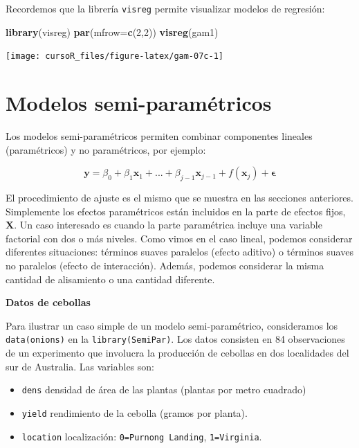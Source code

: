 \documentclass[]{book}
\newenvironment{Shaded}{\begin{snugshade}}{\end{snugshade}}
\newcommand{\KeywordTok}[1]{\textcolor[rgb]{0.13,0.29,0.53}{\textbf{#1}}}
\newcommand{\DataTypeTok}[1]{\textcolor[rgb]{0.13,0.29,0.53}{#1}}
\newcommand{\DecValTok}[1]{\textcolor[rgb]{0.00,0.00,0.81}{#1}}
\newcommand{\NormalTok}[1]{#1}
\begin{document}
Recordemos que la librería \texttt{visreg} permite visualizar modelos de
regresión:

\begin{Shaded}
\begin{Highlighting}[]
\KeywordTok{library}\NormalTok{(visreg)}
\KeywordTok{par}\NormalTok{(}\DataTypeTok{mfrow=}\KeywordTok{c}\NormalTok{(}\DecValTok{2}\NormalTok{,}\DecValTok{2}\NormalTok{))}
\KeywordTok{visreg}\NormalTok{(gam1)}
\end{Highlighting}
\end{Shaded}

\begin{center}\texttt{[image: cursoR\_files/figure-latex/gam-07c-1]} \end{center}

\section{Modelos semi-paramétricos}\label{modelos-semi-paramuxe9tricos}

Los modelos semi-paramétricos permiten combinar componentes lineales
(paramétricos) y no paramétricos, por ejemplo:

\[
\boldsymbol{y} = \beta_0 + \beta_1\boldsymbol{x}_1 + ... + \beta_{j-1}\boldsymbol{x}_{j-1} + f(\boldsymbol{x}_j) + \boldsymbol{\epsilon}
\]

El procedimiento de ajuste es el mismo que se muestra en las secciones
anteriores. Simplemente los efectos paramétricos están incluidos en la
parte de efectos fijos, \(\boldsymbol{X}\). Un caso interesado es cuando
la parte paramétrica incluye una variable factorial con dos o más
niveles. Como vimos en el caso lineal, podemos considerar diferentes
situaciones: términos suaves paralelos (efecto aditivo) o términos
suaves no paralelos (efecto de interacción). Además, podemos considerar
la misma cantidad de alisamiento o una cantidad diferente.

\textbf{Datos de cebollas}

Para ilustrar un caso simple de un modelo semi-paramétrico, consideramos
los \texttt{data(onions)} en la \texttt{library(SemiPar)}. Los datos
consisten en 84 observaciones de un experimento que involucra la
producción de cebollas en dos localidades del sur de Australia. Las
variables son:

\begin{itemize}
\item
  \texttt{dens} densidad de área de las plantas (plantas por metro
  cuadrado)
\item
  \texttt{yield} rendimiento de la cebolla (gramos por planta).
\item
  \texttt{location} localización: \texttt{0=Purnong\ Landing},
  \texttt{1=Virginia}.
\end{itemize}
\end{document}
